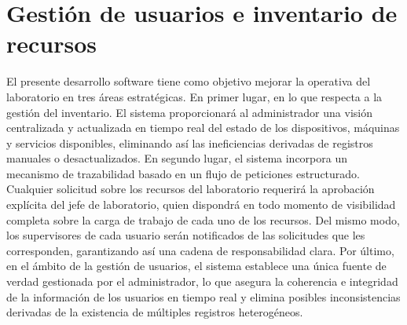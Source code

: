 %
%



\section{Gestión de usuarios e inventario de recursos}
El presente desarrollo software tiene como objetivo mejorar la operativa del laboratorio en tres áreas estratégicas. En primer lugar, en lo que respecta a la gestión del inventario. El sistema proporcionará al administrador una visión centralizada y actualizada en tiempo real del estado de los dispositivos, máquinas y servicios disponibles, eliminando así las ineficiencias derivadas de registros manuales o desactualizados. En segundo lugar, el sistema incorpora un mecanismo de trazabilidad basado en un flujo de peticiones estructurado. Cualquier solicitud sobre los recursos del laboratorio requerirá la aprobación explícita del jefe de laboratorio, quien dispondrá en todo momento de visibilidad completa sobre la carga de trabajo de cada uno de los recursos. Del mismo modo, los supervisores de cada usuario serán notificados de las solicitudes que les corresponden, garantizando así una cadena de responsabilidad clara. Por último, en el ámbito de la gestión de usuarios, el sistema establece una única fuente de verdad gestionada por el administrador, lo que asegura la coherencia e integridad de la información de los usuarios en tiempo real y elimina posibles inconsistencias derivadas de la existencia de múltiples registros heterogéneos.

